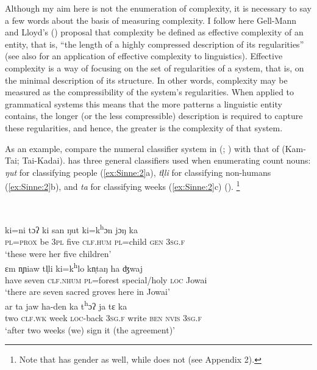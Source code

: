 \documentclass[output=collectionpaper]{langsci/langscibook}
\begin{document}
Although my aim here is not the enumeration of complexity, it is necessary to say a few words about the basis of measuring complexity. I follow here Gell-Mann and Lloyd's (\citeyear[387]{Gell-Mann2004}) proposal that complexity be defined as effective complexity of an entity, that is, ``the length of a highly compressed description of its regularities'' (see also \citealt{Dahl2004} for an application of effective complexity to linguistics). Effective complexity is a way of focusing on the set of regularities of a system, that is, on the minimal description of its structure. In other words, complexity may be measured as the compressibility of the system's regularities. When applied to grammatical systems this means that the more patterns a linguistic entity contains, the longer (or the less compressible) description is required to capture these regularities, and hence, the greater is the complexity of that system.

As an example, compare the numeral classifier system in  (; ) with that of  (Kam-Tai; Tai-Kadai).  has three general classifiers used when enumerating count nouns: \textit{ŋut} for classifying people (\ref{ex:Sinne:2}a), \textit{tl̩li} for classifying non-humans (\ref{ex:Sinne:2}b), and \textit{ta} for classifying weeks (\ref{ex:Sinne:2}c) (\citealt[124--125, 361--362]{Ring2015}).%
\footnote{Note that  has gender as well, while  does not (see Appendix 2).
} %

\ea
\label{ex:Sinne:2}
\\
\begin{xlist}
\ex
\gll ki=ni  tɔʔ ki san ŋut ki=k\textsuperscript{h}ɔn jɔŋ ka\\
\textsc{pl=prox} be \textsc{3pl} five \textsc{clf.hum} \textsc{pl}=child \textsc{gen} \textsc{3sg.f}\\
\glt `these were her five children'\\
\ex
\gll ɛm n̩ɲiaw tl̩li ki=k\textsuperscript{h}lo kn̩taŋ ha ʤwaj\\
have seven \textsc{clf.nhum} \textsc{pl}=forest special/holy \textsc{loc} Jowai\\
\glt `there are seven sacred groves here in Jowai'\\
\ex
\gll ar ta jaw ha-den ka t\textsuperscript{h}ɔʔ ja tɛ ka\\
two \textsc{clf.wk} week \textsc{loc}{}-back \textsc{3sg.f} write \textsc{ben} \textsc{nvis} \textsc{3sg.f}\\
\glt  `after two weeks (we) sign it (the agreement)'\\
\end{xlist}
\z
\end{document}
